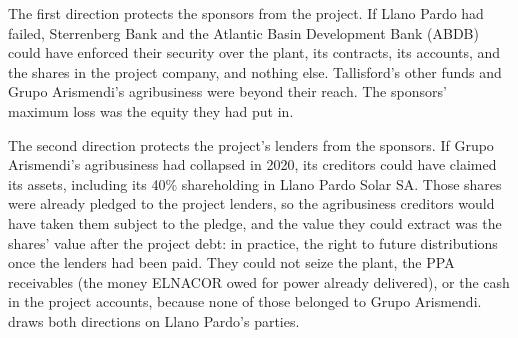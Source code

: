The first direction protects the sponsors from the project. If Llano Pardo had failed, Sterrenberg Bank and the Atlantic Basin Development Bank (ABDB) could have enforced their security over the plant, its contracts, its accounts, and the shares in the project company, and nothing else. Tallisford's other funds and Grupo Arismendi's agribusiness were beyond their reach. The sponsors' maximum loss was the equity they had put in.

The second direction protects the project's lenders from the sponsors. If Grupo Arismendi's agribusiness had collapsed in 2020, its creditors could have claimed its assets, including its 40\% shareholding in Llano Pardo Solar SA. Those shares were already pledged to the project lenders, so the agribusiness creditors would have taken them subject to the pledge, and the value they could extract was the shares' value after the project debt: in practice, the right to future distributions once the lenders had been paid. They could not seize the plant, the PPA receivables (the money ELNACOR owed for power already delivered), or the cash in the project accounts, because none of those belonged to Grupo Arismendi.  draws both directions on Llano Pardo's parties.

\begin{exhibit}[H]
\caption{The two directions of ring-fencing \illustrative}\label{exh:2.1}
\centering
{}
\end{exhibit}

